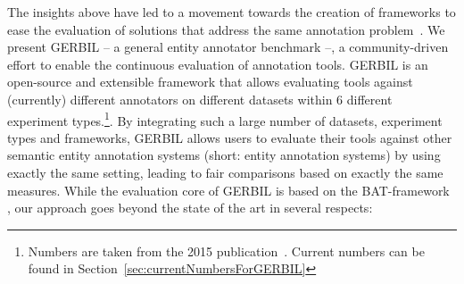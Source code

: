 The insights above have led to a movement towards the creation of frameworks to ease the evaluation of solutions that address the same annotation problem~\cite{ERD2014,cornolti}. 
We present GERBIL -- a general entity annotator benchmark --, a community-driven effort to enable the continuous evaluation of annotation tools. GERBIL is an open-source and extensible framework that allows evaluating tools against (currently) \overallGERBILannotators different annotators on \overalldatasets different datasets within 6 different experiment types.\footnote{Numbers are taken from the 2015 publication~\cite{GERBIL}. Current numbers can be found in Section~\ref{sec:currentNumbersForGERBIL}}. 
By integrating such a large number of datasets, experiment types and frameworks, GERBIL allows users to evaluate their tools against other semantic entity annotation systems (short: entity annotation systems) by using exactly the same setting, leading to fair comparisons based on exactly the same measures. 
While the evaluation core of GERBIL is based on the BAT-framework \cite{cornolti}, our approach goes beyond the state of the art in several respects:
